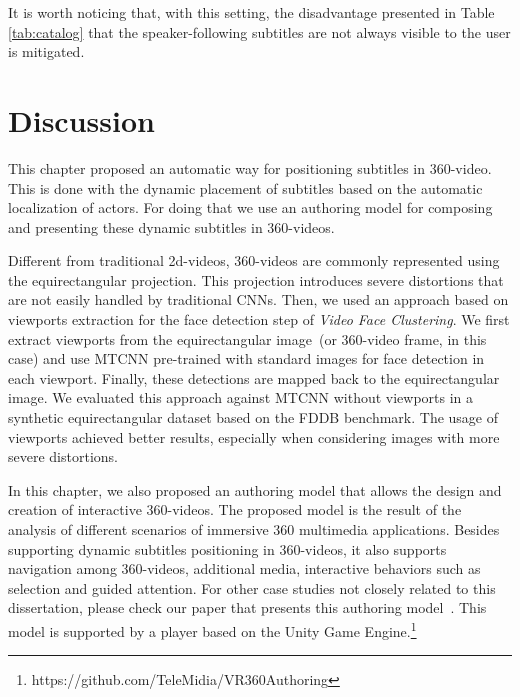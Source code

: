 It is worth noticing that, with this setting, the disadvantage presented in Table \ref{tab:catalog} that the speaker-following subtitles are not always visible to the user is mitigated.

\section{Discussion}

This chapter proposed an automatic way for positioning subtitles in 360-video. This is done with the dynamic placement of subtitles based on the automatic localization of actors. For doing that we use an authoring model for composing and presenting these dynamic subtitles in 360-videos.

Different from traditional 2d-videos, 360-videos are commonly represented using the equirectangular projection. This projection introduces severe distortions that are not easily handled by traditional CNNs. Then, we used an approach based on viewports extraction for the face detection step of \emph{Video Face Clustering}. We first extract viewports from the equirectangular image~(or 360-video frame, in this case) and use MTCNN pre-trained with standard images for face detection in each viewport. Finally, these detections are mapped back to the equirectangular image. We evaluated this approach against MTCNN without viewports in a synthetic equirectangular dataset based on the FDDB benchmark. The usage of viewports achieved better results, especially when considering images with more severe distortions.

In this chapter, we also proposed an authoring model that allows the design and creation of interactive 360-videos. The proposed model is the result of the analysis of different scenarios of immersive 360 multimedia applications. Besides supporting dynamic subtitles positioning in 360-videos, it also supports navigation among 360-videos, additional media, interactive behaviors such as selection and guided attention. For other case studies not closely related to this dissertation, please check our paper that presents this authoring model~\cite{mendes2020authoring}. This model is supported by a player based on the Unity Game Engine.\footnote{https://github.com/TeleMidia/VR360Authoring}

